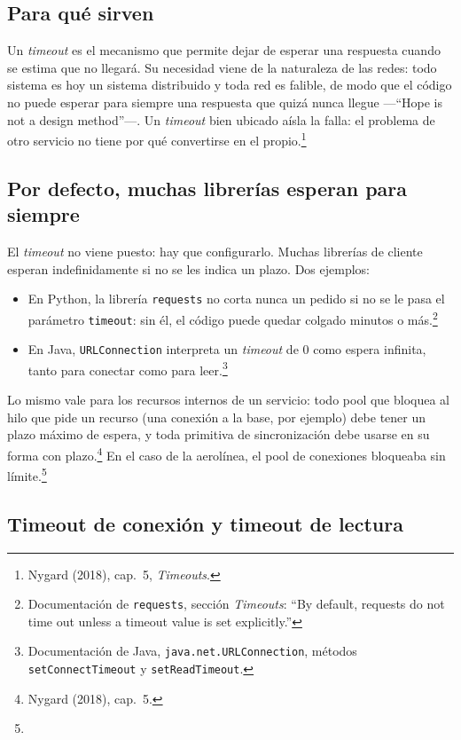 \documentclass[variant=apuntes,cover=institutional,mode=screen]{ua-engineering-v6-article}
\begin{document}
\subsection{Para qué sirven}

Un \emph{timeout} es el mecanismo que permite dejar de esperar una respuesta cuando se estima que no llegará. Su necesidad viene de la naturaleza de las redes: todo sistema es hoy un sistema distribuido y toda red es falible, de modo que el código no puede esperar para siempre una respuesta que quizá nunca llegue ---``Hope is not a design method''---. Un \emph{timeout} bien ubicado aísla la falla: el problema de otro servicio no tiene por qué convertirse en el propio.\footnote{Nygard (2018), cap.~5, \emph{Timeouts}.}

\subsection{Por defecto, muchas librerías esperan para siempre}

El \emph{timeout} no viene puesto: hay que configurarlo. Muchas librerías de cliente esperan indefinidamente si no se les indica un plazo. Dos ejemplos:
\begin{itemize}
\item En Python, la librería \texttt{requests} no corta nunca un pedido si no se le pasa el parámetro \texttt{timeout}: sin él, el código puede quedar colgado minutos o más.\footnote{Documentación de \texttt{requests}, sección \emph{Timeouts}: ``By default, requests do not time out unless a timeout value is set explicitly.''}
\item En Java, \texttt{URLConnection} interpreta un \emph{timeout} de 0 como espera infinita, tanto para conectar como para leer.\footnote{Documentación de Java, \texttt{java.net.URLConnection}, métodos \texttt{setConnectTimeout} y \texttt{setReadTimeout}.}
\end{itemize}
Lo mismo vale para los recursos internos de un servicio: todo pool que bloquea al hilo que pide un recurso (una conexión a la base, por ejemplo) debe tener un plazo máximo de espera, y toda primitiva de sincronización debe usarse en su forma con plazo.\footnote{Nygard (2018), cap.~5.} En el caso de la aerolínea, el pool de conexiones bloqueaba sin límite.\footnote{\historiaaerolinea}

\subsection{Timeout de conexión y timeout de lectura}
\end{document}
